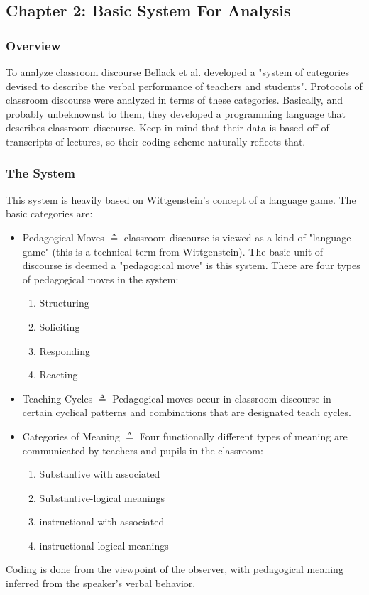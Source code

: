 \documentclass[10pt, letterpaper]{article}
\begin{document}
\subsection*{Chapter 2: Basic System For Analysis}
\label{sec:org059aa06}

\subsubsection*{Overview}
\label{sec:org5ea2999}
To analyze classroom discourse Bellack et al. developed a "system of categories devised to describe the verbal performance of teachers and students". Protocols of classroom discourse were analyzed in terms of these categories. Basically, and probably unbeknownst to them, they developed a programming language that describes classroom discourse. Keep in mind that their data is based off of transcripts of lectures, so their coding scheme naturally reflects that.
\subsubsection*{The System}
\label{sec:org9cd25d4}
This system is heavily based on Wittgenstein's concept of a language game. The basic categories are:
\begin{itemize}
\item Pedagogical Moves \(\triangleq\) classroom discourse is viewed as a kind of "language game" (this is a technical term from Wittgenstein). The basic unit of discourse is deemed a "pedagogical move" is this system. There are four types of pedagogical moves in the system:
\begin{enumerate}
\item Structuring
\item Soliciting
\item Responding
\item Reacting
\end{enumerate}
\item Teaching Cycles \(\triangleq\) Pedagogical moves occur in classroom discourse in certain cyclical patterns and combinations that are designated teach cycles.
\item Categories of Meaning \(\triangleq\) Four functionally different types of meaning are communicated by teachers and pupils in the classroom:
\begin{enumerate}
\item Substantive with associated
\item Substantive-logical meanings
\item instructional with associated
\item instructional-logical meanings
\end{enumerate}
\end{itemize}
Coding is done from the viewpoint of the observer, with pedagogical meaning inferred from the speaker's verbal behavior. 
\end{document}
